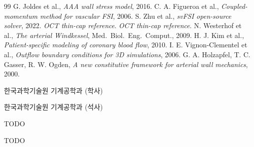 \documentclass[master,english,final]{kaist-ucs}
\begin{document}
\begin{thebibliography}{99}
 G. Joldes et al., \textit{AAA wall stress model}, 2016.
 C. A. Figueroa et al., \textit{Coupled-momentum method for vascular FSI}, 2006.
 S. Zhu et al., \textit{svFSI open-source solver}, 2022.
 \textit{OCT thin-cap reference}.
 \textit{OCT thin-cap reference}.
 N. Westerhof et al., \textit{The arterial Windkessel}, Med.\ Biol.\ Eng.\ Comput., 2009.
 H. J. Kim et al., \textit{Patient-specific modeling of coronary blood flow}, 2010.
 I. E. Vignon-Clementel et al., \textit{Outflow boundary conditions for 3D simulations}, 2006.
 G. A. Holzapfel, T. C. Gasser, R. W. Ogden, \textit{A new constitutive framework for arterial wall mechanics}, 2000.

\end{thebibliography}




\curriculumvitae[1]

\begin{personaldata}
    \address    {[TODO]}
\end{personaldata}

\begin{education}
    \item[2018. 3.\ --\ 2024. 2.] 한국과학기술원 기계공학과 (학사)
    \item[2024. 3.\ --\ 2026. 2.] 한국과학기술원 기계공학과 (석사)
\end{education}

\begin{career}
    \item[TODO] TODO
\end{career}

\begin{publication}
    \item [TODO] TODO
\end{publication}

\label{paperlastpagelabel}
\end{document}
